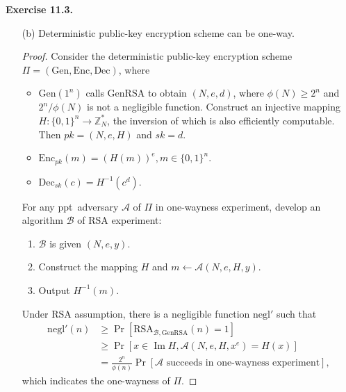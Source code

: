 \documentclass[a4paper]{article}
\newtheorem*{proof}{Proof}
\newenvironment{exercise}[1]{
	\par
	\noindent\textbf{Exercise #1.}\quad
}{
	\par
	\bigskip
}
\DeclareMathOperator{\Image}{\mathop{Im}}
\newcommand{\pbra}[1]{\left( #1 \right)}
\newcommand{\sbra}[1]{\left[ #1 \right]}
\newcommand{\bin}{\{0,1\}}
\newcommand{\Enc}{\mathrm{Enc}}
\newcommand{\Gen}{\mathrm{Gen}}
\newcommand{\Dec}{\mathrm{Dec}}
\newcommand{\KEM}{\mathrm{KEM}}
\newcommand{\GenRSA}{\mathrm{GenRSA}}
\newcommand{\negl}{\mathrm{negl}}
\newcommand{\ppt}{{\sc ppt}~}
\newcommand{\cpa}{\mathrm{cpa}}
\newcommand{\Acal}{\mathcal{A}}
\newcommand{\Bcal}{\mathcal{B}}
\begin{document}
\begin{exercise}{11.3}
\begin{itemize}
\begin{proof}[CPA-security]
\begin{align*}
            \end{align*}
            Thus 
            $$
            \Pr\sbra{\KEM_{\Acal,\Pi}^\cpa(n)=1}\leq\frac12+q(n)\negl(n),
            $$
            which proves the CPA-security of $\Pi$.
        \end{proof}
    \item[(b)] Deterministic public-key encryption scheme can be one-way.
        \begin{proof}
            Consider the deterministic public-key encryption scheme $\Pi=(\Gen,\Enc,\Dec)$, where
            \begin{itemize}
                \item $\Gen(1^n)$ calls $\GenRSA$ to obtain $(N,e,d)$, where $\phi(N)\geq 2^n$ and 
                    $2^n/\phi(N)$ is not a negligible function.
                    Construct an injective mapping $H:\bin^n\to\mathbb Z_N^*$,
                    the inversion of which is also efficiently computable.
                    Then $pk=(N,e,H)$ and $sk=d$.
                \item $\Enc_{pk}(m)=\pbra{H(m)}^e,m\in\bin^n$.
                \item $\Dec_{sk}(c)=H^{-1}\pbra{c^d}$.
            \end{itemize}
            For any \ppt adversary $\Acal$ of $\Pi$ in one-wayness experiment, develop an algorithm $\Bcal$ of RSA experiment:
            \begin{enumerate}
                \item $\Bcal$ is given $(N,e,y)$. 
                \item Construct the mapping $H$ and $m\gets\Acal(N,e,H,y)$.
                \item Output $H^{-1}(m)$.
            \end{enumerate}
            Under RSA assumption, there is a negligible function $\negl'$ such that
            \begin{align*}
                \negl'(n)&\geq\Pr\sbra{\mathrm{RSA}_{\Bcal,\GenRSA}(n)=1}\\
                &\geq\Pr\sbra{x\in\Image H,\Acal(N,e,H,x^e)=H(x)}\\
                &=\frac{2^n}{\phi(n)}\Pr\sbra{\Acal\text{ succeeds in one-wayness experiment}},
            \end{align*}
            which indicates the one-wayness of $\Pi$.
        \end{proof}
\end{itemize}
\end{exercise}
\end{document}
